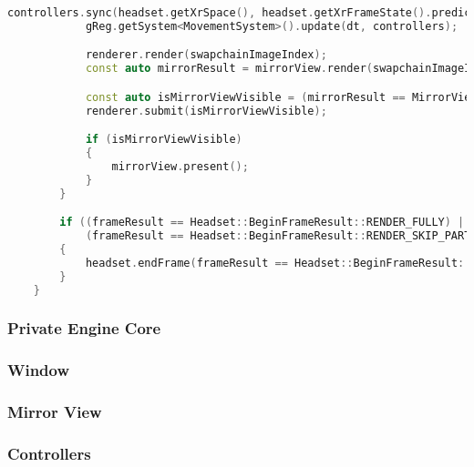 \begin{lstlisting}[language=c++, caption=Engine's main loop (./engine/src/core/core.cpp)]
            controllers.sync(headset.getXrSpace(), headset.getXrFrameState().predictedDisplayTime);
            gReg.getSystem<MovementSystem>().update(dt, controllers);

            renderer.render(swapchainImageIndex);
            const auto mirrorResult = mirrorView.render(swapchainImageIndex);

            const auto isMirrorViewVisible = (mirrorResult == MirrorView::RenderResult::VISIBLE);
            renderer.submit(isMirrorViewVisible);

            if (isMirrorViewVisible)
            {
                mirrorView.present();
            }
        }

        if ((frameResult == Headset::BeginFrameResult::RENDER_FULLY) ||
            (frameResult == Headset::BeginFrameResult::RENDER_SKIP_PARTIALLY))
        {
            headset.endFrame(frameResult == Headset::BeginFrameResult::RENDER_SKIP_PARTIALLY);
        }
    }
\end{lstlisting}
\newpage
\subsubsection{Private Engine Core}
\subsubsection{Window}
\label{sec:window}
\subsubsection{Mirror View}
\label{sec:mirror_view}
\subsubsection{Controllers}
\label{sec:controllers}